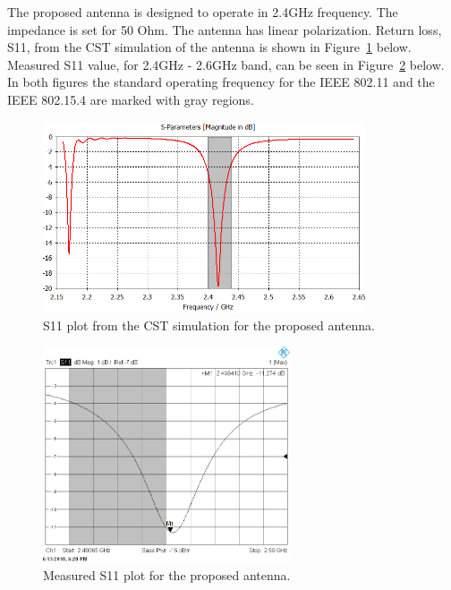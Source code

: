 \documentclass[12pt, oneandhalf, chaparabic, sees, ms]{metu}
\begin{document}
The proposed antenna is designed to operate in 2.4GHz frequency. The impedance is set for 50 Ohm. 
The antenna has linear polarization.
Return loss, S11, from the CST simulation of the antenna is shown in Figure~\ref{fig:corp-FR4-s11} below.
Measured S11 value, for 2.4GHz - 2.6GHz band, can be seen in Figure~\ref{fig:corp-FR4-s11-measured-bw} below. 
In both figures the standard operating frequency for the IEEE 802.11 and the IEEE 802.15.4 are marked with gray regions.
%
%
\begin{figure}[!htbp]
 \begin{center}
  \includegraphics[width=0.85\textwidth]{T2x2-rect-pa-corp-feed-FR4-018mm-connected-by-boolean-add-S11.png}
 \end{center}
 \caption{S11 plot from the CST simulation for the proposed antenna.}
  \label{fig:corp-FR4-s11}
\end{figure}
%
% 
\vspace{-0.5cm}
%
%
%
\begin{figure}[!htbp]
 \begin{center}
  \includegraphics[width=0.65\textwidth]{ant1-s11-measured-bw-marked2.png}
 \end{center}
 \caption{Measured S11 plot for the proposed antenna.}
  \label{fig:corp-FR4-s11-measured-bw}
\end{figure}
\end{document}
